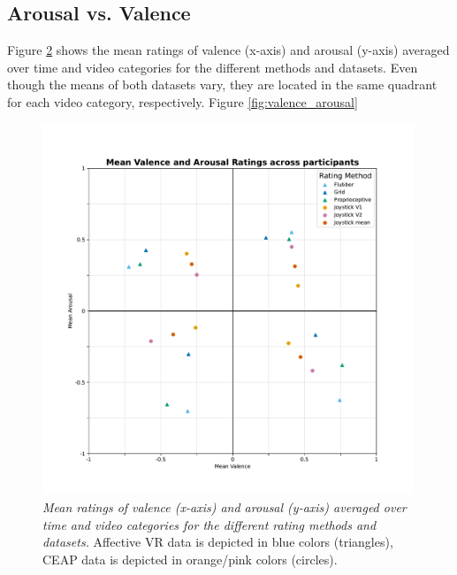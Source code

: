 \documentclass[11pt, letterpaper]{article}
\begin{document}
\begin{figure}
    \label{fig:mean_ratings}
\end{figure}

\newpage

\subsection{Arousal vs. Valence}
Figure \ref{fig:mean_valence_arousal} shows the mean ratings of valence (x-axis) and arousal (y-axis) averaged over time and video categories for the different methods and datasets. Even though the means of both datasets vary, they are located in the same quadrant for each video category, respectively. Figure \ref{fig:valence_arousal}

\begin{figure}[h]
    \centering
    \includegraphics[width=0.99\textwidth]{mean_valence_arousal}
    \caption{\textit{Mean ratings of valence (x-axis) and arousal (y-axis) averaged over time and video categories for the different rating methods and datasets.} Affective VR data is depicted in blue colors (triangles), CEAP data is depicted in orange/pink colors (circles).}
    \label{fig:mean_valence_arousal}
\end{figure}
\end{document}
